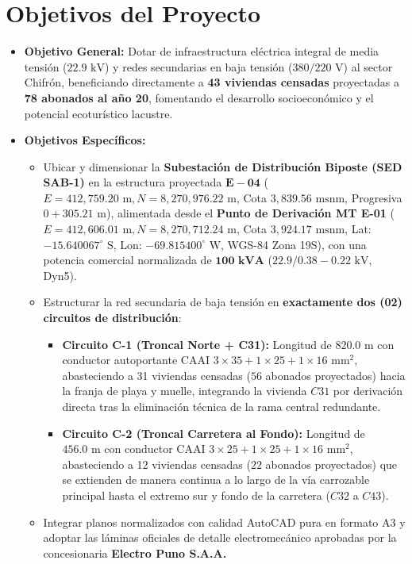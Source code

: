 \documentclass[12pt,a4paper]{report}
\begin{document}
\section{Objetivos del Proyecto}
\begin{itemize}
    \item \textbf{Objetivo General:} Dotar de infraestructura eléctrica integral de media tensión ($22.9\text{ kV}$) y redes secundarias en baja tensión ($380/220\text{ V}$) al sector Chifrón, beneficiando directamente a \textbf{43 viviendas censadas} proyectadas a \textbf{78 abonados al año 20}, fomentando el desarrollo socioeconómico y el potencial ecoturístico lacustre.
    \item \textbf{Objetivos Específicos:}
    \begin{itemize}
        \item Ubicar y dimensionar la \textbf{Subestación de Distribución Biposte (SED SAB-1)} en la estructura proyectada $\mathbf{E-04}$ ($E = 412,759.20\text{ m}, N = 8,270,976.22\text{ m}$, Cota $3,839.56\text{ msnm}$, Progresiva $0+305.21\text{ m}$), alimentada desde el \textbf{Punto de Derivación MT E-01} ($E = 412,606.01\text{ m}, N = 8,270,712.24\text{ m}$, Cota $3,924.17\text{ msnm}$, Lat: $-15.640067^\circ\text{ S}$, Lon: $-69.815400^\circ\text{ W}$, WGS-84 Zona 19S), con una potencia comercial normalizada de $\mathbf{100\text{ kVA}}$ ($22.9 / 0.38 - 0.22\text{ kV}$, Dyn5).
        \item Estructurar la red secundaria de baja tensión en \textbf{exactamente dos (02) circuitos de distribución}:
        \begin{itemize}
            \item \textbf{Circuito C-1 (Troncal Norte + C31):} Longitud de $820.0\text{ m}$ con conductor autoportante CAAI $3\times35+1\times25+1\times16\text{ mm}^2$, abasteciendo a 31 viviendas censadas ($56$ abonados proyectados) hacia la franja de playa y muelle, integrando la vivienda $C31$ por derivación directa tras la eliminación técnica de la rama central redundante.
            \item \textbf{Circuito C-2 (Troncal Carretera al Fondo):} Longitud de $456.0\text{ m}$ con conductor CAAI $3\times25+1\times25+1\times16\text{ mm}^2$, abasteciendo a 12 viviendas censadas ($22$ abonados proyectados) que se extienden de manera continua a lo largo de la vía carrozable principal hasta el extremo sur y fondo de la carretera ($C32$ a $C43$).
        \end{itemize}
        \item Integrar planos normalizados con calidad AutoCAD pura en formato A3 y adoptar las láminas oficiales de detalle electromecánico aprobadas por la concesionaria \textbf{Electro Puno S.A.A.}
    \end{itemize}
\end{itemize}
\end{document}
